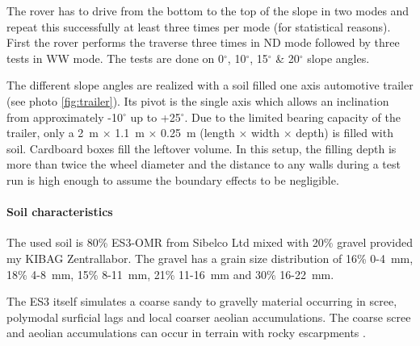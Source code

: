 \documentclass[a4paper,twocolumn]{esapub2005} %
\begin{document}
The rover has to drive from the bottom to the top
of the slope in two modes and repeat this successfully at least three times per mode (for statistical reasons).
First the rover performs the traverse three times in ND mode
followed by three tests in WW mode. The tests are done on
0$^{\circ}$, 10$^{\circ}$, 15$^{\circ}$ \& 20$^{\circ}$ slope angles. 

The different slope angles are realized with a soil filled one axis automotive trailer (see photo
\ref{fig:trailer}). Its pivot is the single axis which allows an inclination
from approximately -10$^{\circ}$ up to +25$^{\circ}$. Due to the limited
bearing capacity of the trailer, only a 2~\unit{m} $\times$ 1.1~\unit{m}
$\times$ 0.25~\unit{m} (length $\times$ width $\times$ depth) is filled with
soil. Cardboard boxes fill the leftover volume. In this setup, the filling
depth is more than twice the wheel diameter and the distance to any walls
during a test run is high enough to assume  the boundary effects to be
negligible.  

\paragraph{Soil characteristics} The used soil is 80\% ES3-OMR from Sibelco Ltd mixed with 20\%
gravel provided my KIBAG Zentrallabor. The gravel has a grain size distribution
of 16\% 0-4~\unit{mm}, 18\% 4-8~\unit{mm}, 15\% 8-11~\unit{mm}, 21\%
11-16~\unit{mm} and 30\% 16-22~\unit{mm}.  

The ES3 itself simulates a coarse sandy to gravelly material occurring in
scree, polymodal surficial lags and local coarser aeolian accumulations. The
coarse scree and aeolian accumulations can occur in terrain with rocky
escarpments \cite{michaud2014}.



\end{document}
